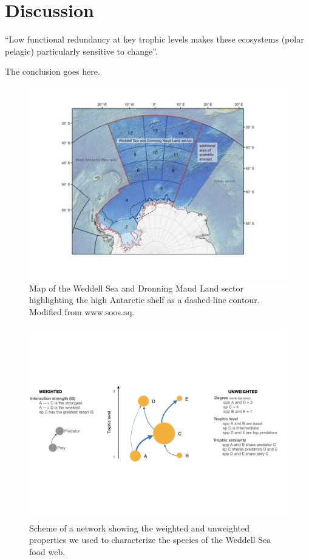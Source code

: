 \documentclass[gc, manuscript]{copernicus}
\begin{document}
\section{Discussion}

``Low functional redundancy at key trophic levels makes these ecosystems
(polar pelagic) particularly sensitive to change''. \citep{Murphy2016}

\clearpage
\conclusions[Conclusions]

The conclusion goes here.

\clearpage

\begin{figure}
\includegraphics[width=12cm]{WeddellSea_map} \caption{Map of the Weddell Sea and Dronning Maud Land sector highlighting the high Antarctic shelf as a dashed-line contour. Modified from www.soos.aq.}\label{fig:unnamed-chunk-1}
\end{figure}

\clearpage

\begin{figure}
\includegraphics[width=12cm]{ToyFoodWeb} \caption{Scheme of a network showing the weighted and unweighted properties we used to characterize the species of the Weddell Sea food web.}\label{fig:unnamed-chunk-2}
\end{figure}
\end{document}

